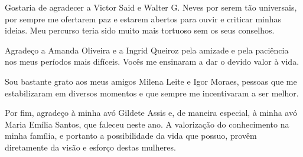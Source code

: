   Gostaria de agradecer a Victor Said e Walter G. Neves por serem tão universais, por sempre me ofertarem paz e estarem abertos para ouvir e criticar minhas ideias. Meu percurso teria sido muito mais tortuoso sem os seus conselhos.

  Agradeço a Amanda Oliveira e a Ingrid Queiroz pela amizade e pela paciência nos meus períodos mais difíceis. Vocês me ensinaram a dar o devido valor à vida.

  Sou bastante grato aos meus amigos Milena Leite e Igor Moraes, pessoas que me estabilizaram em diversos momentos e que sempre me incentivaram a ser melhor.

  Por fim, agradeço à minha avó Gildete Assis e, de maneira especial, à minha avó Maria Emília Santos, que faleceu neste ano. A valorização do conhecimento na minha família, e portanto a possibilidade da vida que possuo, provêm diretamente da visão e esforço destas mulheres.
